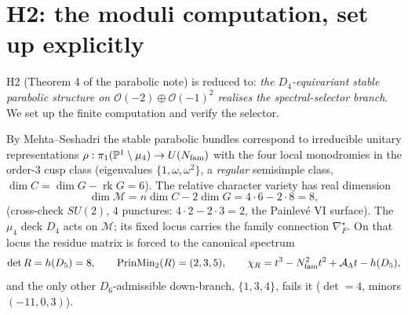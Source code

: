 \section{H2: the moduli computation, set up explicitly}
H2 (Theorem 4 of the parabolic note) is reduced to: \emph{the $D_4$-equivariant stable parabolic
structure on $\mathcal O(-2)\oplus\mathcal O(-1)^2$ realises the spectral-selector branch}. We set up the
finite computation and verify the selector.

\begin{proposition}
\label{prop:h2}
By Mehta--Seshadri the stable parabolic bundles correspond to irreducible unitary representations
$\rho:\pi_1(\mathbb{P}^1\setminus\mu_4)\to U(N_{\mathrm{fam}})$ with the four local monodromies in the order-$3$ cusp class
(eigenvalues $\{1,\omega,\omega^2\}$, a \emph{regular} semisimple class, $\dim C=\dim G-\operatorname{rk}G=6$).
The relative character variety has real dimension
\[
  \dim\mathcal M=n\dim C-2\dim G=4\cdot6-2\cdot8=8 ,
\]
(cross-check $SU(2)$, $4$ punctures: $4\cdot2-2\cdot3=2$, the Painlev\'e VI surface). The $\mu_4$ deck
$D_4$ acts on $\mathcal M$; its fixed locus carries the family connection $\nabla_F^\star$. On that locus
the residue matrix is forced to the canonical spectrum
\[
  \det R=h(D_5)=8,\qquad \operatorname{PrinMin}_2(R)=(2,3,5),\qquad \chi_R=t^3-N_{\mathrm{fam}}^2t^2+\mathcal A_\Lambda t-h(D_5),
\]
and the only other $D_6$-admissible down-branch, $\{1,3,4\}$, fails it ($\det=4$, minors $(-11,0,3)$).
\end{proposition}

